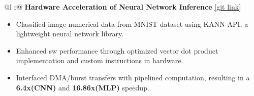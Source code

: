 \documentclass[a4paper,10pt]{article}
\begin{document}
\begin{tabularx}{\linewidth}{ @{}l r@{} }
\textbf{Hardware Acceleration of Neural Network Inference} \href{https://github.com/sharathat45/Vector-dot-product}{[\underline{git link}]}\\[2.75pt]
{
\begin{minipage}[t]{\linewidth}
    \begin{itemize}[nosep,after=\strut, leftmargin=2em, itemsep=3pt]
        \item Classified image numerical data from MNIST dataset using KANN API, a lightweight neural network library.
        \item Enhanced sw performance through optimized vector dot product implementation and custom instructions in hardware.
        \item Interfaced DMA/burst transfers with pipelined computation, resulting in a \textbf{6.4x(CNN)} and \textbf{16.86x(MLP)} speedup.
    \end{itemize}
    \end{minipage}
}
\end{tabularx}

\vspace{-\baselineskip} %
\end{document}
